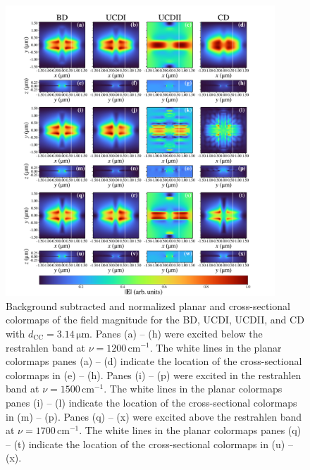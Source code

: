\documentclass[preprint,
amsmath,amssymb,
aip,
jap,
floatfix,]{revtex4-2}
\begin{document}
				\begin{figure}[!htb]
				  \centering\includegraphics[width=0.9\textwidth]{Figures/Fig4.pdf}
				  \caption{ Background subtracted and normalized planar and cross-sectional colormaps of the field magnitude for the BD, UCDI, UCDII, and CD with $d_\mathrm{CC} = 3.14 \, \si{\um}$.  Panes (a) -- (h) were excited below the restrahlen band at $\nu = 1200 \, \mathrm{cm}^{-1}$. The white lines in the planar colormaps panes (a) -- (d) indicate the location of the cross-sectional colormaps in (e) -- (h). Panes (i) -- (p) were excited in the restrahlen band at $\nu = 1500 \, \mathrm{cm}^{-1}$. The white lines in the planar colormaps panes (i) -- (l) indicate the location of the cross-sectional colormaps in (m) -- (p). Panes (q) -- (x) were excited above the restrahlen band at $\nu = 1700 \, \mathrm{cm}^{-1}$. The white lines in the planar colormaps panes (q) -- (t) indicate the location of the cross-sectional colormaps in (u) -- (x). 
				  }
				  \label{fig:3.9}
				\end{figure}
\end{document}
